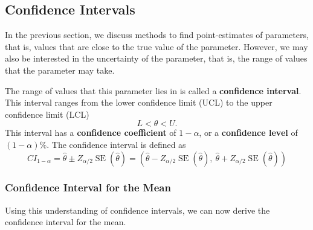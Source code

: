 \documentclass{article}
\begin{document}
\subsection{Confidence Intervals}
In the previous section, we discuss methods to find point-estimates of parameters, that is, values
that are close to the true value of the parameter. However, we may also be interested in the
uncertainty of the parameter, that is, the range of values that the parameter may take.

The range of values that this parameter lies in is called a \textbf{confidence interval}.
This interval ranges from the lower confidence limit (UCL) to the upper confidence limit (LCL)
\begin{equation*}
    L < \theta < U.
\end{equation*}
This interval has a \textbf{confidence coefficient} of \(1 - \alpha\), or a \textbf{confidence level} of \(\left( 1 - \alpha \right)\%\).
The confidence interval is defined as
\begin{equation*}
    {CI}_{1 - \alpha} = \hat{\theta} \pm Z_{\alpha / 2} \operatorname{SE}\left( \hat{\theta} \right) = \left( \hat{\theta} - Z_{\alpha / 2} \operatorname{SE}\left( \hat{\theta} \right),\: \hat{\theta} + Z_{\alpha / 2} \operatorname{SE}\left( \hat{\theta} \right) \right)
\end{equation*}
\subsubsection{Confidence Interval for the Mean}
Using this understanding of confidence intervals, we can now derive the confidence interval for the mean.
\end{document}
